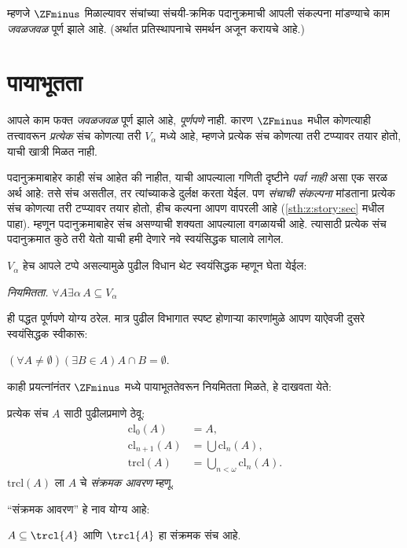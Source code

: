 म्हणजे $\ZFminus$ मिळाल्यावर संचांच्या संचयी-क्रमिक पदानुक्रमाची आपली संकल्पना मांडण्याचे काम \emph{जवळजवळ} पूर्ण झाले आहे. (अर्थात प्रतिस्थापनाचे समर्थन अजून करायचे आहे.)








\section{पायाभूतता}\label{sth:spine:foundation:sec}

आपले काम फक्त \emph{जवळजवळ} पूर्ण झाले आहे, \emph{पूर्णपणे} नाही. कारण $\ZFminus$ मधील कोणत्याही तत्त्वावरून \emph{प्रत्येक} संच कोणत्या तरी $V_\alpha$ मध्ये आहे, म्हणजे प्रत्येक संच कोणत्या तरी टप्प्यावर तयार होतो, याची खात्री मिळत नाही.

पदानुक्रमाबाहेर काही संच आहेत की नाहीत, याची आपल्याला गणिती दृष्टीने \emph{पर्वा नाही} असा एक सरळ अर्थ आहे: तसे संच असतील, तर त्यांच्याकडे दुर्लक्ष करता येईल. पण \emph{संचाची संकल्पना} मांडताना प्रत्येक संच कोणत्या तरी टप्प्यावर तयार होतो, हीच कल्पना आपण वापरली आहे (\ref{sth:z:story:sec} मधील \stageshier{} पाहा). म्हणून पदानुक्रमाबाहेर संच असण्याची शक्यता आपल्याला वगळायची आहे. त्यासाठी प्रत्येक संच पदानुक्रमात कुठे तरी येतो याची हमी देणारे नवे स्वयंसिद्धक घालावे लागेल.

$V_\alpha$ हेच आपले टप्पे असल्यामुळे पुढील विधान थेट स्वयंसिद्धक म्हणून घेता येईल:

\begin{defish}
\emph{नियमितता.} $\forall A \exists \alpha\, A \subseteq V_\alpha$
\end{defish}

ही पद्धत पूर्णपणे योग्य ठरेल. मात्र पुढील विभागात स्पष्ट होणाऱ्या कारणांमुळे आपण याऐवजी दुसरे स्वयंसिद्धक स्वीकारू:

\begin{axiom}[पायाभूतता]
$(\forall A \neq \emptyset)(\exists B \in A)A \cap B = \emptyset$.
\end{axiom}

काही प्रयत्नांनंतर $\ZFminus$ मध्ये पायाभूततेवरून नियमितता मिळते, हे दाखवता येते:
\begin{defn}
प्रत्येक संच $A$ साठी पुढीलप्रमाणे ठेवू:
\begin{align*}
	\text{cl}_0(A) &= A,\\
	\text{cl}_{n+1}(A) &= \bigcup \text{cl}_n(A),\\
	\text{trcl}(A) &= \bigcup_{n < \omega} \text{cl}_{n}(A).
\end{align*}
$\text{trcl}(A)$ ला $A$ चे \emph{संक्रमक आवरण} म्हणू.
\end{defn}
\noindent
``संक्रमक आवरण'' हे नाव योग्य आहे:
\begin{prop}\label{sth:spine:foundation:subsetoftrcl}
$A \subseteq \trcl{A}$ आणि $\trcl{A}$ हा संक्रमक संच आहे.
\end{prop}

